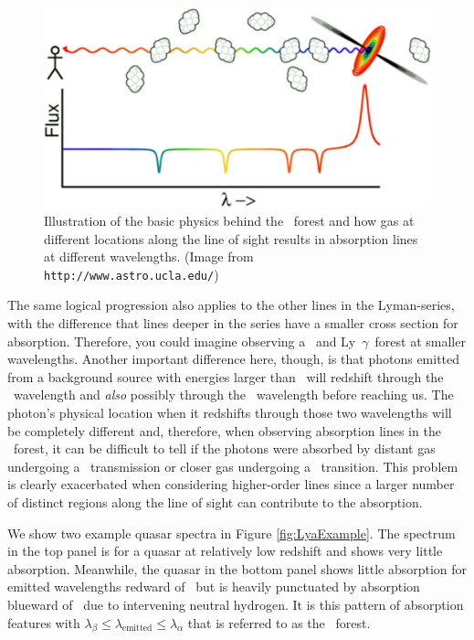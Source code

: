 \begin{figure}[h]
  \centering
  \includegraphics[width=12cm]{lyaf-75.eps}
  \caption{Illustration of the basic physics behind the \lya\ forest and how gas at different locations along the line of sight results in absorption lines at different wavelengths. (Image from {\tt http://www.astro.ucla.edu/})}
  \label{fig:LyaCartoon}
\end{figure}

The same logical progression also applies to the other lines in the Lyman-series, with the difference that lines deeper in the series have a smaller cross section for absorption. Therefore, you could imagine observing a \lyb\ and Ly\ $\gamma$\ forest at smaller wavelengths. Another important difference here, though, is that photons emitted from a background source with energies larger than \lyb\ will redshift through the \lyb\ wavelength and \textit{also} possibly through the \lya\ wavelength before reaching us. The photon's physical location when it redshifts through those two wavelengths will be completely different and, therefore, when observing absorption lines in the \lyb\ forest, it can be difficult to tell if the photons were absorbed by distant gas undergoing a \lyb\ transmission or closer gas undergoing a \lya\ transition. This problem is clearly exacerbated when considering higher-order lines since a larger number of distinct regions along the line of sight can contribute to the absorption.


We show two example quasar spectra in Figure \ref{fig:LyaExample}. The spectrum in the top panel is for a quasar at relatively low redshift and shows very little absorption. Meanwhile, the quasar in the bottom panel shows little absorption for emitted wavelengths redward of \lya\ but is heavily punctuated by absorption blueward of \lya\ due to intervening neutral hydrogen. It is this pattern of absorption features with $\lambda_{\beta} \leq \lambda_{\text{emitted}} \leq \lambda_{\alpha}$ that is referred to as the \lya\ forest.
 
